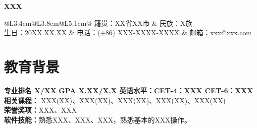 \documentclass{resume}
\begin{document}

\vspace*{-1.2cm}

\noindent
\begin{minipage}[t]{0.74\textwidth}
	\vspace{0pt}
	{\Huge\bfseries XXX}

	\vspace{1em}

{\fontsize{10pt}{13pt}\selectfont
	\begin{tabular}{@{}L{3.4cm}@{\hspace{0.45em}\hspace{0.45em}}L{3.8cm}@{\hspace{0.45em}\hspace{0.45em}}L{5.1cm}@{}}
		籍贯：XX省XX市 & 民族：X族 \\[0.35em]
		生日：20XX.XX.XX & 电话：(+86) XXX-XXXX-XXXX & 邮箱：xxx@xxx.com
	\end{tabular}
}
\end{minipage}
\hfill
\begin{minipage}[t]{2.8cm}
	\vspace{0pt}
	\centering
	\raisebox{0.45cm}{%
		\rule{2.5cm}{3.2cm}%
	}
\end{minipage}

\vspace{-3 em}

\section{教育背景}
\textbf{专业排名 X/XX}\hspace{2em} \textbf{GPA X.XX/X.X} \hspace{2em} \textbf{英语水平：}\textbf{CET-4：XXX\hspace{2em} CET-6：XXX} \\
\textbf{相关课程：} XXX(XX)、XXX(XX)、XXX(XX)、XXX(XX)、XXX(XX)\\
\textbf{荣誉奖项：}XXX、XXX\\
\textbf{软件技能：}熟悉XXX、XXX、XXX，熟悉基本的XXX操作。

\end{document}

